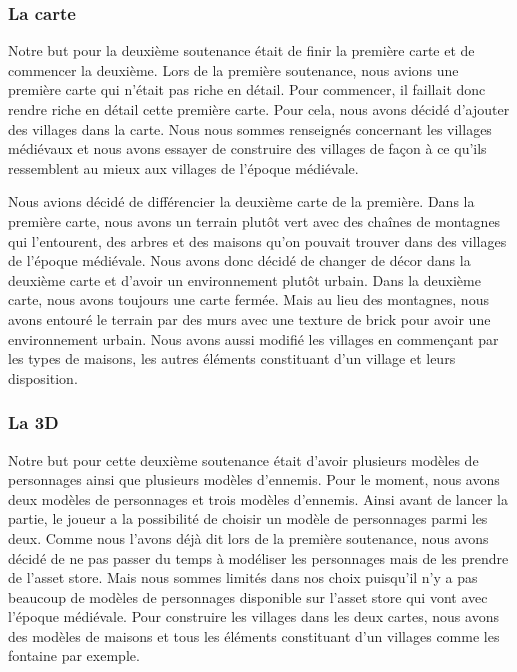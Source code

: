 \documentclass[a4paper, 12pt]{article}
\begin{document}
		\subsubsection{La carte}
		Notre but pour la deuxième soutenance était de finir la première carte et de commencer la deuxième. Lors de la première soutenance, nous avions une première carte qui n'était pas riche en détail. Pour commencer, il faillait donc rendre riche en détail cette première carte. Pour cela, nous avons décidé d’ajouter des villages dans la carte. Nous nous sommes renseignés concernant les villages médiévaux et nous avons essayer de construire des villages de façon à ce qu’ils ressemblent au mieux aux villages de l'époque médiévale.    
\par Nous avions décidé de différencier la deuxième carte de la première. Dans la première carte, nous avons un terrain plutôt vert avec des chaînes de montagnes qui l’entourent, des arbres et des maisons qu’on pouvait trouver dans des villages de l'époque médiévale. Nous avons donc décidé de changer de décor dans la deuxième carte et d’avoir un environnement plutôt  urbain. Dans la deuxième carte, nous avons toujours une carte fermée. Mais au lieu des montagnes, nous avons entouré le terrain par des murs avec une texture de brick pour avoir une environnement urbain. Nous avons aussi modifié les villages en commençant par les types de maisons, les autres éléments constituant d’un village et leurs disposition.


		\subsubsection{La 3D}
		Notre but pour cette deuxième soutenance était d’avoir plusieurs modèles de personnages ainsi que plusieurs modèles d’ennemis. Pour le moment, nous avons deux modèles de personnages et trois modèles d’ennemis. Ainsi avant de lancer la partie, le joueur a la possibilité de choisir un modèle de personnages parmi les deux. Comme nous l’avons déjà dit lors de la première soutenance, nous avons décidé de ne pas passer du temps à modéliser les personnages mais de les prendre de l’asset store. Mais nous sommes limités dans nos choix puisqu’il n’y a pas beaucoup de modèles de personnages disponible sur l’asset store qui vont avec l’époque médiévale.  Pour construire les villages dans les deux cartes, nous avons des modèles de maisons et tous les éléments constituant d’un villages comme les fontaine par exemple.
\end{document}
